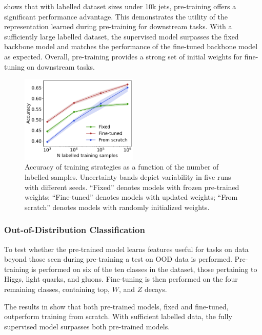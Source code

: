  shows that with labelled dataset sizes under 10k jets, pre-training offers a significant performance advantage.
This demonstrates the utility of the representation learned during pre-training for downstream tasks.
With a sufficiently large labelled dataset, the supervised model surpasses the fixed backbone model and matches the performance of the fine-tuned backbone model as expected.
Overall, pre-training provides a strong set of initial weights for fine-tuning on downstream tasks.

\begin{figure}[tp!]
    \centering
    \includegraphics[width=0.5\textwidth]{Figures/foundation_models/mpm1/jc_corrected_pt_40_accuracy.pdf}
    \caption{
        Accuracy of training strategies as a function of the number of labelled samples. Uncertainty bands depict variability in five runs with different seeds.
        ``Fixed'' denotes models with frozen pre-trained weights; ``Fine-tuned'' denotes models with updated weights; ``From scratch'' denotes models with randomly initialized weights.
    }
    \label{fig:fine_tune_jetclass}
\end{figure}

\subsubsection{Out-of-Distribution Classification}

To test whether the pre-trained model learns features useful for tasks on data beyond those seen during pre-training a test on OOD data is performed.
Pre-training is performed on six of the ten classes in the dataset, those pertaining to Higgs, light quarks, and gluons.
Fine-tuning is then performed on the four remaining classes, containing top, $W$, and $Z$ decays.

The results in  show that both pre-trained models, fixed and fine-tuned, outperform training from scratch.
With sufficient labelled data, the fully supervised model surpasses both pre-trained models.

